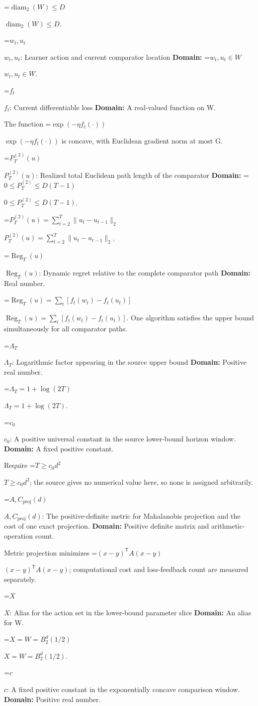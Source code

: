 \documentclass[10pt,a4paper]{article}
\newcommand{\AtlasMath}[1]{\par\begingroup\centering\setbox0=\hbox{$\displaystyle #1$}\ifdim\wd0>1.4\linewidth\typeout{ATLAS WIDE FORMULA: \the\wd0}\fi\ifdim\wd0>\linewidth\resizebox{\linewidth}{!}{\box0}\else\box0\fi\par\endgroup}
\newcommand{\AtlasInlineMath}[1]{\begingroup\setbox0=\hbox{$#1$}\ifdim\wd0>.4\linewidth\endgroup\AtlasMath{#1}\else\endgroup$#1$\fi}
\begin{document}
\AtlasInlineMath{\operatorname{diam}_2(W)\le D}.

\AtlasInlineMath{w_t,u_t}: Learner action and current comparator location \textbf{Domain:} \AtlasInlineMath{w_t,u_t\in W}.

\AtlasInlineMath{f_t}: Current differentiable loss \textbf{Domain:} A real-valued function on W.

The function \AtlasInlineMath{\exp(-\eta f_t(\cdot))} is concave, with Euclidean gradient norm at most G.

\AtlasInlineMath{P_T^{(2)}(u)}: Realized total Euclidean path length of the comparator \textbf{Domain:} \AtlasInlineMath{0\le P_T^{(2)}\le D(T-1)}.

\AtlasInlineMath{P_T^{(2)}(u)=\sum_{t=2}^T\|u_t-u_{t-1}\|_2}.

\AtlasInlineMath{\operatorname{Reg}_T(u)}: Dynamic regret relative to the complete comparator path \textbf{Domain:} Real number.

\AtlasInlineMath{\operatorname{Reg}_T(u)=\sum_t[f_t(w_t)-f_t(u_t)]}. One algorithm satisfies the upper bound simultaneously for all comparator paths.

\AtlasInlineMath{\Lambda_T}: Logarithmic factor appearing in the source upper bound \textbf{Domain:} Positive real number.

\AtlasInlineMath{\Lambda_T=1+\log(2T)}.

\AtlasInlineMath{c_0}: A positive universal constant in the source lower-bound horizon window. \textbf{Domain:} A fixed positive constant.

Require \AtlasInlineMath{T\ge c_0d^2}; the source gives no numerical value here, so none is assigned arbitrarily.

\AtlasInlineMath{A,C_{\mathrm{proj}}(d)}: The positive-definite metric for Mahalanobis projection and the cost of one exact projection. \textbf{Domain:} Positive definite matrix and arithmetic-operation count.

Metric projection minimizes \AtlasInlineMath{(x-y)^{\mathsf T}A(x-y)}; computational cost and loss-feedback count are measured separately.

\AtlasInlineMath{X}: Alias for the action set in the lower-bound parameter slice \textbf{Domain:} An alias for W.

\AtlasInlineMath{X=W=B_2^d(1/2)}.

\AtlasInlineMath{c}: A fixed positive constant in the exponentially concave comparison window. \textbf{Domain:} Positive real number.
\end{document}
